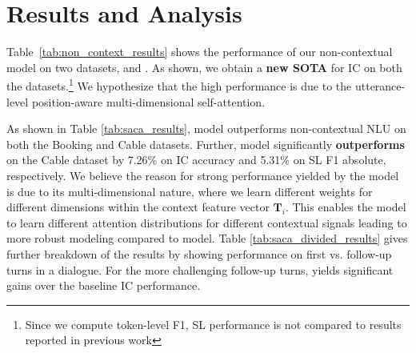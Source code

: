 \section{Results and Analysis}
\label{sec:results_f}

Table~\ref{tab:non_context_results} shows the performance of our non-contextual model on two datasets,  and . As shown, we obtain a \textbf{new SOTA} for IC on both the datasets.\footnote{Since we compute token-level F1, SL performance is not compared to results reported in previous work} We hypothesize that the high performance is due to the utterance-level position-aware multi-dimensional self-attention.%

As shown in Table \ref{tab:saca_results},  model outperforms non-contextual NLU on both the Booking and Cable datasets. Further,  model significantly \textbf{outperforms}  on the Cable dataset by 7.26\% on IC accuracy and 5.31\% on SL F1 absolute, respectively. We believe the reason for strong performance yielded by the  model is due to its multi-dimensional nature, where we learn different weights for different dimensions within the context feature vector ${\mathbf{T}_i}$. This enables the model to learn different attention distributions for different contextual signals leading to more robust modeling compared to  model. Table \ref{tab:saca_divided_results} gives further breakdown of the results by showing performance on
first
vs. follow-up turns in a dialogue. For the more challenging follow-up turns,  yields significant gains over the baseline IC performance.

